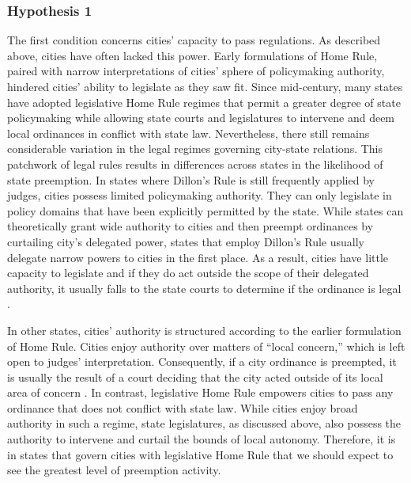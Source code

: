 \documentclass[12pt]{article}
\begin{document}
\subsubsection*{Hypothesis 1}
The first condition concerns cities' capacity to pass regulations. As described above, cities have often lacked this power. Early formulations of Home Rule, paired with narrow interpretations of cities' sphere of policymaking authority, hindered cities' ability to legislate as they saw fit. Since mid-century, many states have adopted legislative Home Rule regimes that permit a greater degree of state policymaking while allowing state courts and legislatures to intervene and deem local ordinances in conflict with state law. Nevertheless, there still remains considerable variation in the legal regimes governing city-state relations. This patchwork of legal rules results in differences across states in the likelihood of state preemption. In states where Dillon's Rule is still frequently applied by judges, cities possess limited policymaking authority. They can only legislate in policy domains that have been explicitly permitted by the state. While states can theoretically grant wide authority to cities and then preempt ordinances by curtailing city's delegated power, states that employ Dillon's Rule usually delegate narrow powers to cities in the first place. As a result, cities have little capacity to legislate and if they do act outside the scope of their delegated authority, it usually falls to the state courts to determine if the ordinance is legal \parencite{dillerIntrastatePreemption2007}.

In other states, cities' authority is structured according to the earlier formulation of Home Rule. Cities enjoy authority over matters of ``local concern,'' which is left open to judges' interpretation. Consequently, if a city ordinance is preempted, it is usually the result of a court deciding that the city acted outside of its local area of concern \parencite{dillerIntrastatePreemption2007}. In contrast, legislative Home Rule empowers cities to pass any ordinance that does not conflict with state law. While cities enjoy broad authority in such a regime, state legislatures, as discussed above, also possess the authority to intervene and curtail the bounds of local autonomy. Therefore, it is in states that govern cities with legislative Home Rule that we should expect to see the greatest level of preemption activity. 
\end{document}
